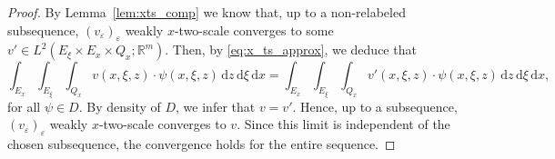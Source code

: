 \documentclass[10pt,a4paper]{amsart}
\newcommand{\R}{\mathbb{R}}
\newcommand{\dd}{\,\mathrm{d}}
\renewcommand{\epsilon}{\varepsilon}
\newcommand{\sequence}[2]{(#1_#2)_{#2}}
\newcommand{\veps}{\varepsilon}
\begin{document}
\begin{proof}
By Lemma~\ref{lem:xts_comp} we know that, up to a non-relabeled subsequence, $(v_\epsilon)_\epsilon$ weakly $x$-two-scale converges to some $v'\in L^2(E_\xi\times E_x\times Q_x;\R^m)$. Then, by \eqref{eq:x_ts_approx}, we deduce that
\[
\int_{E_x}\int_{E_\xi}\int_{Q_x}v(x,\xi,z) \cdot \psi(x,\xi,z)\dd z\dd \xi \dd x = \int_{E_x}\int_{E_\xi}\int_{Q_x}v'(x,\xi,z)\cdot \psi(x,\xi,z)\dd z\dd \xi \dd x,
\]
for all $\psi \in D$. By density of $D$, we infer that $v=v'$. Hence, up to a subsequence, $(v_\epsilon)_\epsilon$ weakly $x$-two-scale converges to $v$. Since this limit is independent of the chosen subsequence, the convergence holds for the entire sequence.

\end{proof}
\end{document}
